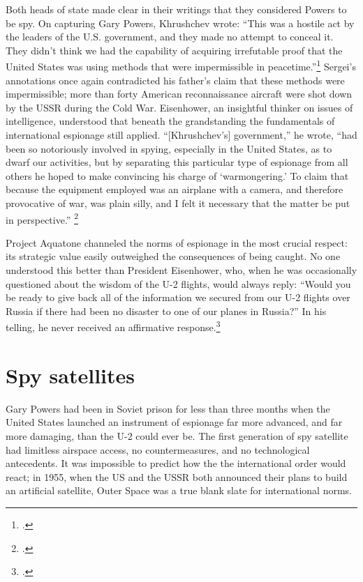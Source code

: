 \documentclass[14pt]{extarticle}
\begin{document}
Both heads of state made clear in their writings that they considered Powers to be spy. On capturing Gary Powers, Khrushchev wrote: ``This was a hostile act by the leaders of the U.S. government, and they made no attempt to conceal it. They didn't think we had the capability of \textelp{} acquiring irrefutable proof that the United States was using methods that were impermissible in peacetime.''\footcite[p.~239]{khrushchev_memoirs_2007} Sergei's annotations once again contradicted his father's claim that these methods were impermissible; more than forty American reconnaissance aircraft were shot down by the USSR during the Cold War. Eisenhower, an insightful thinker on issues of intelligence, understood that beneath the grandstanding the fundamentals of international espionage still applied. \enquote{[Khrushchev's] government,} he wrote, \enquote{had been so notoriously involved in spying, especially in the United States, as to dwarf our activities, but by separating this particular type of espionage from all others he hoped to make convincing his charge of \enquote{warmongering.} To claim that because the equipment employed was an airplane with a camera, and therefore provocative of war, was plain silly, and I felt it necessary that the matter be put in perspective.} \footcite[p.~551]{eisenhower_waging_1965}


Project Aquatone channeled the norms of espionage in the most crucial respect: its strategic value easily outweighed the consequences of being caught. No one understood this better than President Eisenhower, who, when he was occasionally questioned about the wisdom of the U-2 flights, would always reply: \enquote{Would you be ready to give back all of the information we secured from our U-2 flights over Russia if there had been no disaster to one of our planes in Russia?} In his telling, he never received an affirmative response.\footcite[p.~559]{eisenhower_waging_1965}


\section{Spy satellites}
Gary Powers had been in Soviet prison for less than three months when the United States launched an instrument of espionage far more advanced, and far more damaging, than the U-2 could ever be. The first generation of spy satellite had limitless airspace access, no countermeasures, and no technological antecedents. It was impossible to predict how the the international order would react; in 1955, when the US and the USSR both announced their plans to build an artificial satellite, Outer Space was a true blank slate for international norms.
\end{document}
